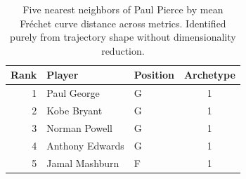 \begin{table}[htbp]
  \centering\small
  \begin{tabular}{rllc}
    \toprule
    Rank & Player & Position & Archetype \\
    \midrule
    1 & Paul George & G & 1 \\
    2 & Kobe Bryant & G & 1 \\
    3 & Norman Powell & G & 1 \\
    4 & Anthony Edwards & G & 1 \\
    5 & Jamal Mashburn & F & 1 \\
    \bottomrule
  \end{tabular}
  \caption{Five nearest neighbors of Paul Pierce by mean Fr\'{e}chet curve distance across metrics. Identified purely from trajectory shape without dimensionality reduction.}
  \label{tab:Paul_Pierce_frechet_curve_neighbors}
\end{table}

